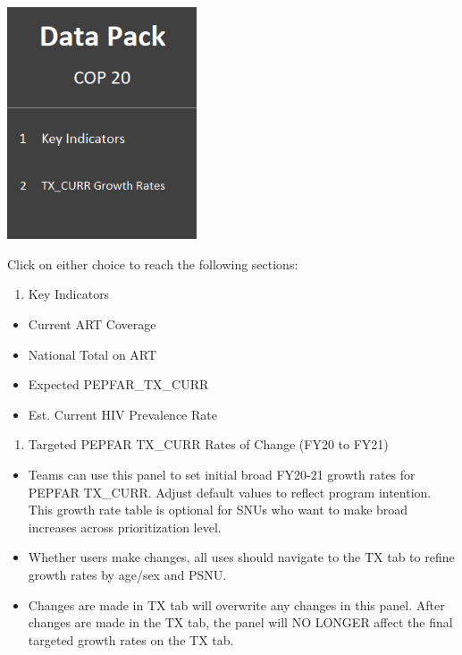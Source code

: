 \documentclass[
  openany]{book}
\providecommand{\tightlist}{%
  \setlength{\itemsep}{0pt}\setlength{\parskip}{0pt}}
\begin{document}
\begin{center}

\includegraphics[width=2.2085247156605425in, height=2.7002340332458443in]{./images/image14.png}

\end{center}

Click on either choice to reach the following sections:

\begin{enumerate}
\def\labelenumi{\arabic{enumi}.}
\tightlist
\item
  Key Indicators
\end{enumerate}

\begin{itemize}
\item
  Current ART Coverage
\item
  National Total on ART
\item
  Expected PEPFAR\_TX\_CURR
\item
  Est. Current HIV Prevalence Rate
\end{itemize}

\begin{enumerate}
\def\labelenumi{\arabic{enumi}.}
\setcounter{enumi}{1}
\tightlist
\item
  Targeted PEPFAR TX\_CURR Rates of Change (FY20 to FY21)
\end{enumerate}

\begin{itemize}
\item
  Teams can use this panel to set initial broad FY20-21 growth rates
  for PEPFAR TX\_CURR. Adjust default values to reflect program
  intention. This growth rate table is optional for SNUs who want to
  make broad increases across prioritization level.
\item
  Whether users make changes, all uses should navigate to the TX tab
  to refine growth rates by age/sex and PSNU.
\item
  Changes are made in TX tab will overwrite any changes in this panel.
  After changes are made in the TX tab, the panel will NO LONGER
  affect the final targeted growth rates on the TX tab.
\end{itemize}
\end{document}
